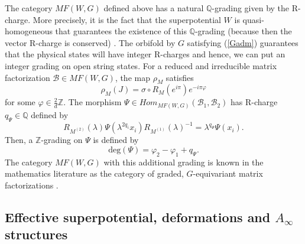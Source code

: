 \documentclass[a4paper,11pt]{article}
\numberwithin{equation}{section}
\begin{document}
The category $MF(W,G)$ defined above has a natural $\mathbb{Q}$-grading given 
by the R-charge. More precisely, it is the fact that the superpotential $W$ is 
quasi-homogeneous that guarantees the existence of this $\mathbb{Q}$-grading 
(because then the vector R-charge is conserved) \cite{Walcher:2004tx}. The 
orbifold by $G$ satisfying 
(\ref{Gadm}) guarantees that the physical states will have integer 
R-charges \cite{Vafa:1989xc} and hence, we can put an integer grading on open 
string states. For a reduced and irreducible matrix factorization 
$\mathcal{B}\in MF(W,G)$, the map 
$\rho_{M}$ satisfies \cite{Walcher:2004tx}
\begin{equation}
\rho_{M}(J)=\sigma \circ R_{M}(e^{i\pi})e^{-i\pi\varphi}
\end{equation}
for some $\varphi \in \frac{2}{d}\mathbb{Z}$. The morphism $\Psi\in 
Hom_{MF(W,G)}(\mathcal{B}_{1},\mathcal{B}_{2})$ has R-charge 
$q_{\Psi}\in\mathbb{Q}$ defined by
\begin{equation}
R_{M^{(2)}}(\lambda)\Psi(\lambda^{2q_{i}} 
x_{i})R_{M^{(1)}}(\lambda)^{-1}=\lambda^{q_{\Psi}}\Psi( x_{i}).
\end{equation}
Then, a $\mathbb{Z}$-grading on $\Psi$ is defined by
\begin{equation}
\mathrm{deg}(\Psi)=\varphi_{2}-\varphi_{1}+q_{\Psi}.
\end{equation}
The category $MF(W,G)$ with this additional grading is known in the mathematics 
literature as the category of graded, $G$-equivariant matrix factorizations 
\cite{orlov2009derived}.

\subsection{Effective superpotential, deformations and $A_{\infty}$ 
structures}\label{sec:effpot}
\end{document}
